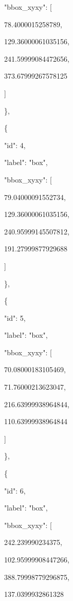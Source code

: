 \documentclass[10pt,a4paper]{article}
\begin{document}
      "bbox\_xyxy":\allowbreak{} [\par
        78.4000015258789,\allowbreak{}\par
        129.36000061035156,\allowbreak{}\par
        241.59999084472656,\allowbreak{}\par
        373.67999267578125\par
      ]\par
    \},\allowbreak{}\par
    \{\par
      "id":\allowbreak{} 4,\allowbreak{}\par
      "label":\allowbreak{} "box",\allowbreak{}\par
      "bbox\_xyxy":\allowbreak{} [\par
        79.04000091552734,\allowbreak{}\par
        129.36000061035156,\allowbreak{}\par
        240.95999145507812,\allowbreak{}\par
        191.27999877929688\par
      ]\par
    \},\allowbreak{}\par
    \{\par
      "id":\allowbreak{} 5,\allowbreak{}\par
      "label":\allowbreak{} "box",\allowbreak{}\par
      "bbox\_xyxy":\allowbreak{} [\par
        70.08000183105469,\allowbreak{}\par
        71.76000213623047,\allowbreak{}\par
        216.63999938964844,\allowbreak{}\par
        110.63999938964844\par
      ]\par
    \},\allowbreak{}\par
    \{\par
      "id":\allowbreak{} 6,\allowbreak{}\par
      "label":\allowbreak{} "box",\allowbreak{}\par
      "bbox\_xyxy":\allowbreak{} [\par
        242.239990234375,\allowbreak{}\par
        102.95999908447266,\allowbreak{}\par
        388.79998779296875,\allowbreak{}\par
        137.0399932861328\par
\end{document}
